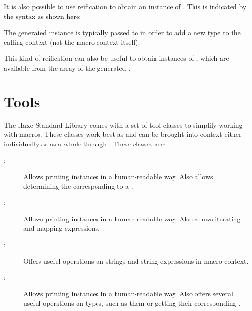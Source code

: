\documentclass{haxe}
\begin{document}
It is also possible to use reification to obtain an instance of . This is indicated by the  syntax as shown here:


The generated  instance is typically passed to  in order to add a new type to the calling context (not the macro context itself).

This kind of reification can also be useful to obtain instances of , which are available from the  array of the generated . 

\section{Tools}
\label{macro-tools}

The Haxe Standard Library comes with a set of tool-classes to simplify working with macros. These classes work best as  and can be brought into context either individually or as a whole through . These classes are:

\begin{description}
	\item[:] Allows printing  instances in a human-readable way. Also allows determining the  corresponding to a .
	\item[:] Allows printing  instances in a human-readable way. Also allows iterating and mapping expressions.
	\item[:] Offers useful operations on strings and string expressions in macro context.
	\item[:] Allows printing  instances in a human-readable way. Also offers several useful operations on types, such as  them or getting their corresponding .
\end{description}

\end{document}
